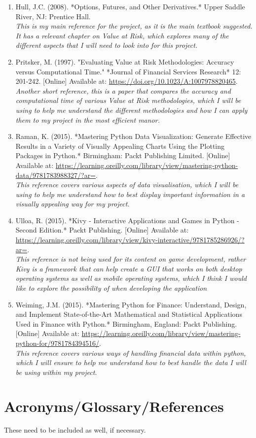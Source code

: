 \documentclass{article}
\begin{document}
\begin{enumerate}
  \item Hull, J.C. (2008). *Options, Futures, and Other Derivatives.* Upper Saddle River, NJ: Prentice Hall.
  \\\textit{This is my main reference for the project, as it is the main textbook suggested. It has a relevant chapter on Value at Risk, which explores many of the different aspects that I will need to look into for this project.}

  \item Pritsker, M. (1997). "Evaluating Value at Risk Methodologies: Accuracy versus Computational Time." *Journal of Financial Services Research* 12: 201-242. [Online] Available at: \url{https://doi.org/10.1023/A:1007978820465}.
  \\\textit{Another short reference, this is a paper that compares the accuracy and computational time of various Value at Risk methodologies, which I will be using to help me understand the different methodologies and how I can apply them to my project in the most efficient manor. }

  \item Raman, K. (2015). *Mastering Python Data Visualization: Generate Effective Results in a Variety of Visually Appealing Charts Using the Plotting Packages in Python.* Birmingham: Packt Publishing Limited. [Online] Available at: \url{https://learning.oreilly.com/library/view/mastering-python-data/9781783988327/?ar=}.
  \\\textit{This reference covers various aspects of data visualisation, which I will be using to help me understand how to best display important information in a visually appealing way for my project.}

  \item Ulloa, R. (2015). *Kivy - Interactive Applications and Games in Python - Second Edition.* Packt Publishing. [Online] Available at: \url{https://learning.oreilly.com/library/view/kivy-interactive/9781785286926/?ar=}.
  \\\textit{This reference is not being used for its content on game development, rather Kivy is a framework that can help create a GUI that works on both desktop operating systems as well as mobile operating systems, which I think I would like to explore the possibility of when developing the application}

  \item Weiming, J.M. (2015). *Mastering Python for Finance: Understand, Design, and Implement State-of-the-Art Mathematical and Statistical Applications Used in Finance with Python.* Birmingham, England: Packt Publishing. [Online] Available at: \url{https://learning.oreilly.com/library/view/mastering-python-for/9781784394516/}.
  \\\textit{This reference covers various ways of handling financial data within python, which I will ensure to help me understand how to best handle the data I will be using within my project.}
\end{enumerate}



\section{Acronyms/Glossary/References}
These need to be included as well, if necessary.
\end{document}
